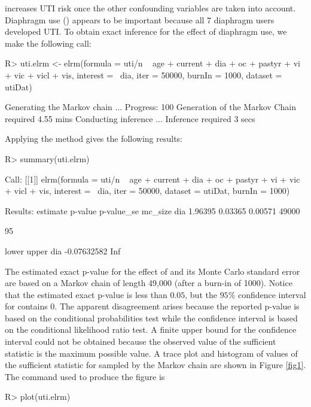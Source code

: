 \documentclass[article, shortnames]{jss}
\begin{document}
increases UTI risk once the other confounding variables are taken
into account. Diaphragm use () appears to be important
because all 7 diaphragm users developed UTI. To obtain exact
inference for the effect of diaphragm use, we make the following
call:
\begin{CodeChunk}
\begin{CodeInput}
R> uti.elrm <- elrm(formula = uti/n ~ age + current + dia + oc +
pastyr + vi + vic + vicl + vis, interest = ~dia, iter = 50000,
burnIn = 1000, dataset = utiDat)
\end{CodeInput}
\begin{CodeOutput}
Generating the Markov chain ...
Progress: 100%
Generation of the Markov Chain required 4.55 mins
Conducting inference ...
Inference required 3 secs
\end{CodeOutput}
\end{CodeChunk}

Applying the  method gives the following results:
\begin{CodeChunk}
\begin{CodeInput}
R> summary(uti.elrm)
\end{CodeInput}
\begin{CodeOutput}
Call:
[[1]]
elrm(formula = uti/n ~ age + current + dia + oc + pastyr + vi + vic + vicl
     + vis, interest = ~dia, iter = 50000, dataset = utiDat, burnIn = 1000)

Results:
    estimate p-value p-value_se mc_size
dia  1.96395 0.03365    0.00571   49000

95%

          lower upper
dia -0.07632582   Inf
\end{CodeOutput}
\end{CodeChunk}
The estimated exact p-value for the effect of  and its
Monte Carlo standard error are based on a Markov chain of length
49,000 (after a burn-in of 1000). Notice that the estimated exact
p-value is less than $0.05$, but the $95\%$ confidence interval
for  contains $0$. The apparent disagreement arises
because the reported p-value is based on the conditional
probabilities test while the confidence interval is based on the
conditional likelihood ratio test. A finite upper bound for the
confidence interval could not be obtained because the observed
value of the sufficient statistic is the maximum possible value. A
trace plot and histogram of values of the sufficient statistic for
 sampled by the Markov chain are shown in Figure
\ref{fig1}. The command used to produce the figure is
\begin{CodeChunk}
\begin{CodeInput}
R> plot(uti.elrm)
\end{CodeInput}
\end{CodeChunk}
\end{document}
